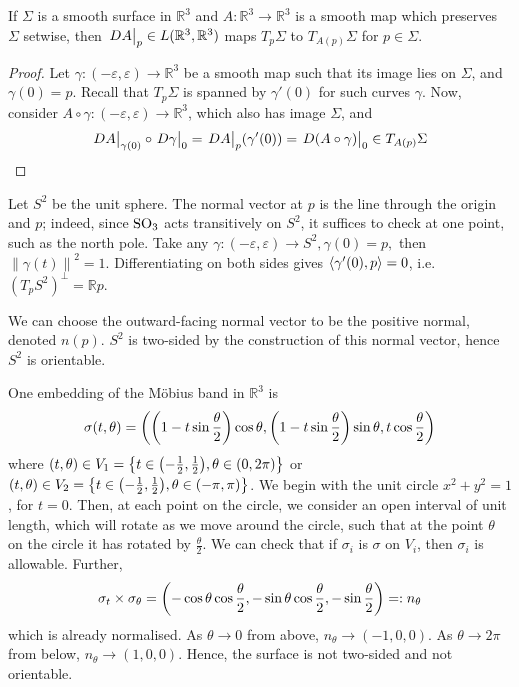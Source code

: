 \documentclass[a4paper,11pt]{article}
\renewcommand{\epsilon}{\varepsilon}
\begin{document}
\begin{lemma}
	If \( \Sigma \) is a smooth surface in \( \mathbb R^3 \) and \( A \colon \mathbb R^3 \to \mathbb R^3 \) is a smooth map which preserves \( \Sigma \) setwise, then \( \eval{DA}_p \in L(\mathbb R^3, \mathbb R^3) \) maps \( T_p \Sigma \) to \( T_{A(p)} \Sigma \) for \( p \in \Sigma \).
\end{lemma}
\begin{proof}
	Let \( \gamma \colon (-\varepsilon, \varepsilon) \to \mathbb R^3 \) be a smooth map such that its image lies on \( \Sigma \), and \( \gamma(0) = p \).
	Recall that \( T_p \Sigma \) is spanned by \( \gamma'(0) \) for such curves \( \gamma \).
	Now, consider \( A \circ \gamma \colon (-\varepsilon, \varepsilon) \to \mathbb R^3 \), which also has image \( \Sigma \), and
	\[
		\teval{DA}{\gamma(0)} \circ \teval{D\gamma}{0} = \teval{DA}{p} \qty(\gamma'(0)) = \teval{D(A \circ \gamma)}{0} \in T_{A(p)} \Sigma
	\]
\end{proof}
\begin{example}
	Let \( S^2 \) be the unit sphere.
	The normal vector at \( p \) is the line through the origin and \( p \); indeed, since \( \mathrm{SO}_3 \) acts transitively on \( S^2 \), it suffices to check at one point, such as the north pole. Take any $ \gamma:(-\epsilon,\epsilon)\to S^2, \gamma(0)=p, $ then $ \left\| \gamma(t) \right\|^2 = 1 $. Differentiating on both sides gives $ \left\langle{\gamma'(0),p}\right\rangle = 0 $, i.e. $ (T_p S^2)^{\perp} = \mathbb{R} p $. 

	We can choose the outward-facing normal vector to be the positive normal, denoted \( n(p) \).
	\( S^2 \) is two-sided by the construction of this normal vector, hence \( S^2 \) is orientable.
\end{example}

\begin{example}
	One embedding of the M\"obius band in \( \mathbb R^3 \) is
	\[
		\sigma(t,\theta) = \qty(\qty(1 - t \sin \frac{\theta}{2})\cos \theta, \qty(1 - t \sin \frac{\theta}{2})\sin \theta, t \cos \frac{\theta}{2})
	\]
	where \( (t,\theta) \in V_1 = \qty{t \in \qty(-\frac{1}{2}, \frac{1}{2}), \theta \in (0,2\pi)} \) or \( (t,\theta) \in V_2 = \qty{t \in \qty(-\frac{1}{2}, \frac{1}{2}), \theta \in (-\pi, \pi)} \).
	We begin with the unit circle \( x^2 + y^2 = 1 \), for \( t = 0 \).
	Then, at each point on the circle, we consider an open interval of unit length, which will rotate as we move around the circle, such that at the point \( \theta \) on the circle it has rotated by \( \frac{\theta}{2} \).
	We can check that if \( \sigma_i \) is \( \sigma \) on \( V_i \), then \( \sigma_i \) is allowable.
	Further,
	\[
		\sigma_t \times \sigma_\theta = \qty(-\cos\theta \cos\frac{\theta}{2}, -\sin\theta \cos\frac{\theta}{2}, -\sin\frac{\theta}{2}) =: n_\theta
	\]
	which is already normalised.
	As \( \theta \to 0 \) from above, \( n_\theta \to (-1,0,0) \).
	As \( \theta \to 2\pi \) from below, \( n_\theta \to (1,0,0) \).
	Hence, the surface is not two-sided and not orientable. 
\end{example}
\end{document}
